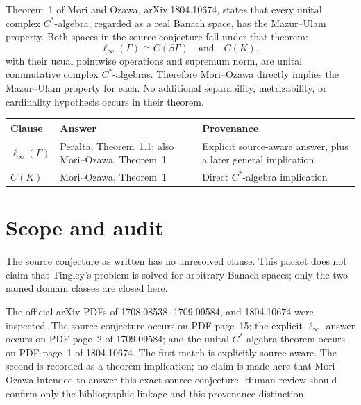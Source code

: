 \documentclass[11pt]{article}
\newcommand{\linf}{\ell_\infty}
\begin{document}
Theorem~1 of Mori and Ozawa, arXiv:1804.10674, states that every unital complex
$C^*$-algebra, regarded as a real Banach space, has the Mazur--Ulam property.
Both spaces in the source conjecture fall under that theorem:
\[
  \linf(\Gamma)\cong C(\beta\Gamma)
  \quad\text{and}\quad
  C(K),
\]
with their usual pointwise operations and supremum norm, are unital
commutative complex $C^*$-algebras.  Therefore Mori--Ozawa directly implies
the Mazur--Ulam property for each.  No additional separability, metrizability,
or cardinality hypothesis occurs in their theorem.

\begin{center}
\renewcommand{\arraystretch}{1.15}
\begin{tabular}{>{\raggedright\arraybackslash}p{}
                >{\raggedright\arraybackslash}p{}
                >{\raggedright\arraybackslash}p{}}
\toprule
Clause & Answer & Provenance \\
\midrule
$\linf(\Gamma)$ & Peralta, Theorem~1.1; also Mori--Ozawa, Theorem~1
& Explicit source-aware answer, plus a later general implication \\
$C(K)$ & Mori--Ozawa, Theorem~1 & Direct $C^*$-algebra implication \\
\bottomrule
\end{tabular}
\end{center}

\section{Scope and audit}

The source conjecture as written has no unresolved clause.  This packet does
not claim that Tingley's problem is solved for arbitrary Banach spaces; only
the two named domain classes are closed here.

The official arXiv PDFs of 1708.08538, 1709.09584, and 1804.10674 were
inspected.  The source conjecture occurs on PDF page~15; the explicit
$\linf$ answer occurs on PDF page~2 of 1709.09584; and the unital
$C^*$-algebra theorem occurs on PDF page~1 of 1804.10674.  The first match is
explicitly source-aware.  The second is recorded as a theorem implication;
no claim is made here that Mori--Ozawa intended to answer this exact source
conjecture.  Human review should confirm only the bibliographic linkage and
this provenance distinction.
\end{document}

